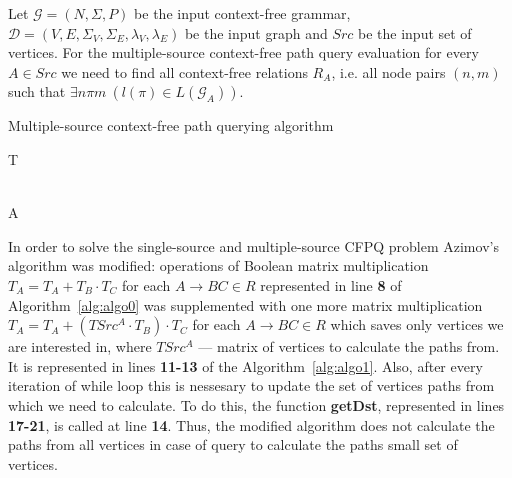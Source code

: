  Let \mbox{$\mathcal{G} = (N, \Sigma, P)$} be the input context-free grammar, $\mathcal{D} = (V, E, \Sigma_V, \Sigma_E, \lambda_V, \lambda_E)$ be the input graph and $Src$ be the input set of vertices. For the multiple-source context-free path query evaluation for every $A \in Src$ we need to find all context-free relations $R_A$, i.e. all node pairs \mbox{$(n,m)$} such that \mbox{$\exists n \pi m~(l(\pi) \in L(\mathcal{G}_A))$}.
\begin{algorithm}
\begin{algorithmic}[1]
\caption{Multiple-source context-free path querying algorithm}
\label{alg:algo1}
    

     
    \EndFor

     
        \EndFor
    \EndFor

     
        \EndFor
    \EndWhile
    \State \Return T
\EndFunction

\\

    \EndFor
    \State \Return A
\EndFunction
\end{algorithmic}
\end{algorithm}
In order to solve the single-source and multiple-source CFPQ problem Azimov's algorithm was modified: operations of Boolean matrix multiplication $T_A = T_A + T_B \cdot T_C$ for each $A \rightarrow BC \in R$ represented in line \textbf{8} of Algorithm~\ref{alg:algo0} was supplemented with one more matrix multiplication $T_A = T_A + (TSrc^A \cdot T_B) \cdot T_C$ for each $A \rightarrow BC \in R$ which saves only vertices we are interested in, where $TSrc^A$ --- matrix of vertices to calculate the paths from. It is represented in lines \textbf{11-13} of the Algorithm~\ref{alg:algo1}. Also, after every iteration of while loop this is nessesary to update the set of vertices paths from which we need to calculate. To do this, the function \textbf{getDst}, represented in lines \textbf{17-21}, is called at line \textbf{14}. Thus, the modified algorithm does not calculate the paths from all vertices in case of query to calculate the paths small set of vertices.

